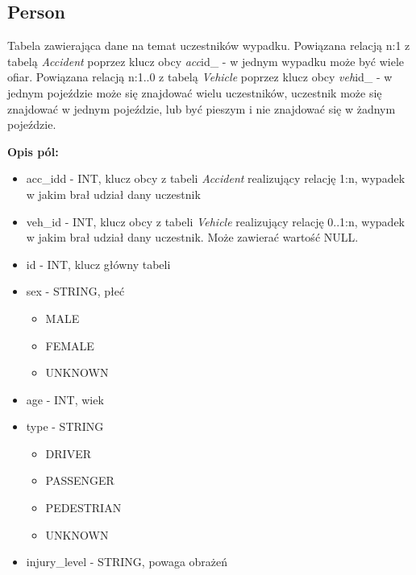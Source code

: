 \subsection{Person}\label{person}

Tabela zawierająca dane na temat uczestników wypadku. Powiązana relacją
n:1 z tabelą \emph{Accident} poprzez klucz obcy \emph{acc}id\_ - w
jednym wypadku może być wiele ofiar. Powiązana relacją n:1..0 z tabelą
\emph{Vehicle} poprzez klucz obcy \emph{veh}id\_ - w jednym pojeździe
może się znajdować wielu uczestników, uczestnik może się znajdować w
jednym pojeździe, lub być pieszym i nie znajdować się w żadnym
pojeździe.

\textbf{Opis pól:}

\begin{itemize}
\item
  acc\_idd - INT, klucz obcy z tabeli \emph{Accident} realizujący
  relację 1:n, wypadek w jakim brał udział dany uczestnik\\
\item
  veh\_id - INT, klucz obcy z tabeli \emph{Vehicle} realizujący relację
  0..1:n, wypadek w jakim brał udział dany uczestnik. Może zawierać
  wartość NULL.\\
\item
  id - INT, klucz główny tabeli\\
\item
  sex - STRING, płeć

  \begin{itemize}
  \itemsep1pt\parskip0pt
  \item
    MALE\\
  \item
    FEMALE\\
  \item
    UNKNOWN\\
  \end{itemize}
\item
  age - INT, wiek\\
\item
  type - STRING

  \begin{itemize}
  \itemsep1pt\parskip0pt
  \item
    DRIVER\\
  \item
    PASSENGER\\
  \item
    PEDESTRIAN\\
  \item
    UNKNOWN\\
  \end{itemize}
\item
  injury\_level - STRING, powaga obrażeń


\end{itemize}
